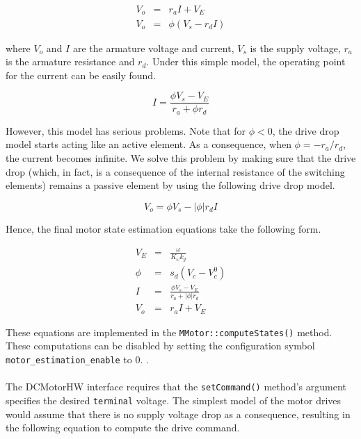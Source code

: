 \begin{eqnarray*}
V_o & = & r_a I + V_E \\
V_o & = & \phi ( V_s - r_d I )
\end{eqnarray*}

\noindent where $V_o$ and $I$ are the armature voltage and current, $V_s$ is
the supply voltage, $r_a$ is the armature resistance and $r_d$. Under this
simple model, the operating point for the current can be easily found.

\begin{equation*}
I = \frac{\phi V_s - V_E}{r_a + \phi r_d}
\end{equation*}

However, this model has serious problems. Note that for $\phi < 0$, the
drive drop model starts acting like an active element. As a consequence,
when $\phi = -r_a/r_d$, the current becomes infinite. We solve this problem
by making sure that the drive drop (which, in fact, is a consequence of the
internal resistance of the switching elements) remains a passive element by
using the following drive drop model.

\begin{equation*}
V_o  =  \phi V_s - |\phi| r_d I
\label{eq:drive_model}
\end{equation*}

Hence, the final motor state estimation equations take the following form.

\begin{eqnarray*}
V_E & = & \frac{\omega}{K_\omega k_g} \\
\phi & = & s_d (V_c - V_c^0) \\
I & = & \frac{\phi V_s - V_E}{r_a + |\phi| r_d} \\
V_o & = & r_a I + V_E
\end{eqnarray*}

These equations are implemented in the {\tt MMotor::computeStates()}
method. These computations can be disabled by setting the configuration
symbol {\tt motor\_estimation\_enable} to 0. 
.\\

\\

The DCMotorHW interface requires that the {\tt setCommand()} method's
argument specifies the desired {\tt terminal} voltage. The simplest model of
the motor drives would assume that there is no supply voltage drop as a
consequence, resulting in the following equation to compute the drive
command.

